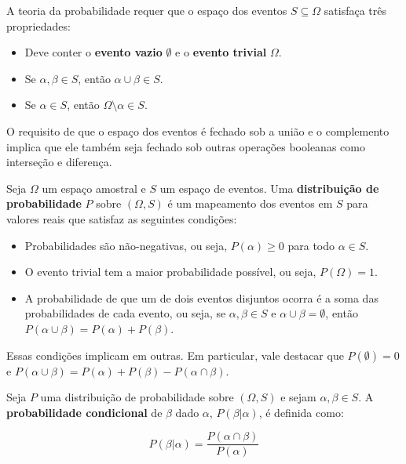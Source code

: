 A teoria da probabilidade requer que o espaço dos eventos $S \subseteq \Omega$ satisfaça três propriedades:

\begin{itemize}
  \item Deve conter o \textbf{evento vazio} $\emptyset$ e o \textbf{evento trivial} $\Omega$.
  \item Se $\alpha, \beta \in S$, então $\alpha \cup \beta \in S$.
  \item Se $\alpha \in S$, então $\Omega \setminus \alpha \in S$.
\end{itemize}

O requisito de que o espaço dos eventos é fechado sob a união e o complemento implica que ele também seja fechado sob outras operações booleanas como interseção e diferença.

\begin{definition}
  Seja $\Omega$ um espaço amostral e $S$ um espaço de eventos. Uma \textbf{distribuição de probabilidade} $P$ sobre $(\Omega, S)$ é um mapeamento dos eventos em $S$ para valores reais que satisfaz as seguintes condições:

  \begin{itemize}
    \item Probabilidades são não-negativas, ou seja, $P(\alpha) \geq 0$ para todo $\alpha \in S$.
    \item O evento trivial tem a maior probabilidade possível, ou seja, $P(\Omega) = 1$.
    \item A probabilidade de que um de dois eventos disjuntos ocorra é a soma das probabilidades de cada evento, ou seja, se $\alpha, \beta \in S$ e $\alpha \cup \beta = \emptyset$, então $P(\alpha \cup \beta) = P(\alpha) + P(\beta)$.
  \end{itemize}

  Essas condições implicam em outras. Em particular, vale destacar que $P(\emptyset) = 0$ e $P(\alpha \cup \beta) = P(\alpha) + P(\beta) - P(\alpha \cap \beta)$.
\end{definition}

\begin{definition}
  Seja $P$ uma distribuição de probabilidade sobre $(\Omega, S)$ e sejam $\alpha, \beta \in S$. A \textbf{probabilidade condicional} de $\beta$ dado $\alpha$, $P(\beta | \alpha)$, é definida como:

  $$P(\beta | \alpha) = \frac{P(\alpha \cap \beta)}{P(\alpha)}$$
\end{definition}

